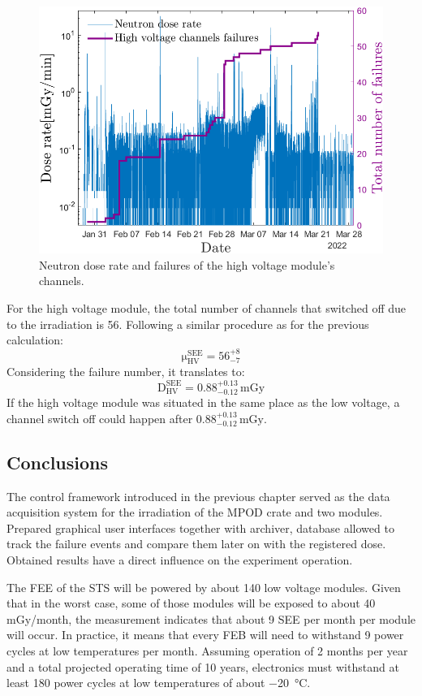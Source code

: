 \begin{figure}[!h]
    \centering
    \includegraphics[width=0.6\columnwidth]{Chapter4/images/Hv_neutrons_dose_rate.png}
    \caption{Neutron dose rate and failures of the high voltage module's channels.}
    \label{fig:hv_neutrons_rate}
\end{figure}
For the high voltage module, the total number of channels that switched off due to the irradiation is 56. Following a similar procedure as for the previous calculation:
  \begin{equation}
 \mathrm{\mu}_{\mathrm{HV}}^{\mathrm{SEE}}=\mathrm{56}_{-7}^{+8}
\end{equation}
Considering the failure number, it translates to:
\begin{equation}
    \mathrm{D}_{\mathrm{HV}}^{\mathrm{SEE}}=\mathrm{0.88}_{-0.12}^{+0.13}\mathrm{\,mGy}
\end{equation}
If the high voltage module was situated in the same place as the low voltage, a channel switch off could happen after $\mathrm{0.88}_{-0.12}^{+0.13}\mathrm{\,mGy}$.
\newpage
\subsection{Conclusions}

\label{irradiation_results}
The control framework introduced in the previous chapter served as the data acquisition system for the irradiation of the MPOD crate and two modules. Prepared graphical user interfaces together with archiver, database allowed to track the failure events and compare them later on with the registered dose. Obtained results have a direct influence on the experiment operation.

The \gls{FEE} of the \gls{STS} will be powered by about 140 low voltage modules. Given that in the worst case, some of those modules will be exposed to about 40\,mGy/month, the measurement indicates that about 9 \gls{SEE} per month per module will occur. In practice, it means that every FEB will need to withstand 9 power cycles at low temperatures per month. Assuming operation of 2 months per year and a total projected operating time of 10 years, electronics must withstand at least 180 power cycles at low temperatures of about \SI{-20}{\celsius}.
